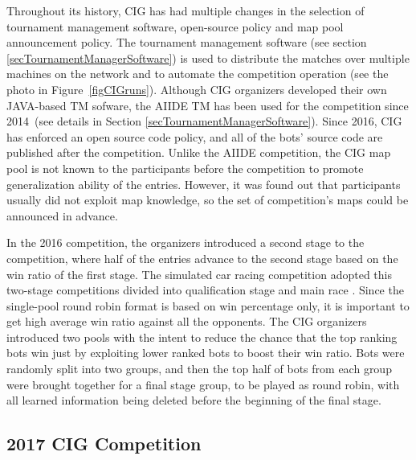 Throughout its history, CIG has had multiple changes in the selection of tournament management software, open-source policy and map pool announcement policy. The tournament management software (see section \ref{secTournamentManagerSoftware}) is used to distribute the matches over multiple machines on the network and to automate the competition operation (see the photo in Figure~\ref{figCIGruns}). Although CIG organizers developed their own JAVA-based TM sofware, the AIIDE TM has been used for the competition since 2014~(see details in Section \ref{secTournamentManagerSoftware}). Since 2016, CIG has enforced an open source code policy, and all of the bots' source code are published after the competition. Unlike the AIIDE competition, the CIG map pool is not known to the participants before the competition to promote generalization ability of the entries. However, it was found out that participants usually did not exploit map knowledge, so the set of competition's maps could be announced in advance. 
 
In the 2016 competition, the organizers introduced a second stage to the competition, where half of the entries advance to the second stage based on the win ratio of the first stage. The simulated car racing competition adopted this two-stage competitions divided into qualification stage and main race \cite{loiacono20102009}. Since the single-pool round robin format is based on win percentage only, it is important to get high average win ratio against all the opponents. The CIG organizers introduced two pools with the intent to reduce the chance that the top ranking bots win just by exploiting lower ranked bots to boost their win ratio. Bots were randomly split into two groups, and then the top half of bots from each group were brought together for a final stage group, to be played as round robin, with all learned information being deleted before the beginning of the final stage. 

\subsection{2017 CIG Competition}\label{subsecCIGnews}

